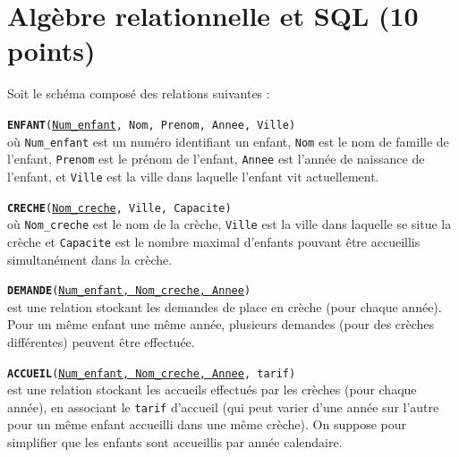 
\section{Alg\`ebre relationnelle et SQL (10 points)}

Soit le sch\'ema compos\'e des relations suivantes :\\

\smallskip

\texttt{\textbf{ENFANT}(\underline{Num\_enfant}, Nom, Prenom, Annee,
Ville)}\\ 
o\`u \texttt{Num\_enfant} est un num\'ero identifiant un enfant, 
\texttt{Nom} est le nom de famille de l'enfant, \texttt{Prenom} est le
pr\'enom de l'enfant, \texttt{Annee} est l'ann\'ee de naissance de l'enfant, et
\texttt{Ville} est la ville dans laquelle l'enfant vit actuellement.\\

\smallskip

\texttt{\textbf{CRECHE}(\underline{Nom\_creche}, Ville, Capacite)}\\ 
o\`u \texttt{Nom\_creche} est le nom de la cr\`eche,
 \texttt{Ville} est la ville dans laquelle se situe la cr\`eche et 
 \texttt{Capacite} est le nombre maximal d'enfants pouvant
 \^etre accueillis simultan\'ement dans la cr\`eche.\\


\smallskip

\texttt{\textbf{DEMANDE}(\underline{Num\_enfant, Nom\_creche, Annee})}\\ 
est une relation stockant les demandes de place en cr\`eche (pour chaque
ann\'ee). Pour un m\^eme enfant une m\^eme ann\'ee, plusieurs demandes (pour
des cr\`eches diff\'erentes) peuvent \^etre effectu\'ee.\\

\smallskip

\texttt{\textbf{ACCUEIL}(\underline{Num\_enfant, Nom\_creche, Annee}, tarif)}\\ 
est une relation stockant les accueils effectu\'es par les cr\`eches (pour
chaque ann\'ee), en associant le \texttt{tarif} d'accueil (qui peut varier d'une
ann\'ee sur l'autre pour un m\^eme enfant accueilli dans une m\^eme cr\`eche).
On suppose pour simplifier que les enfants sont accueillis par ann\'ee
calendaire. 

